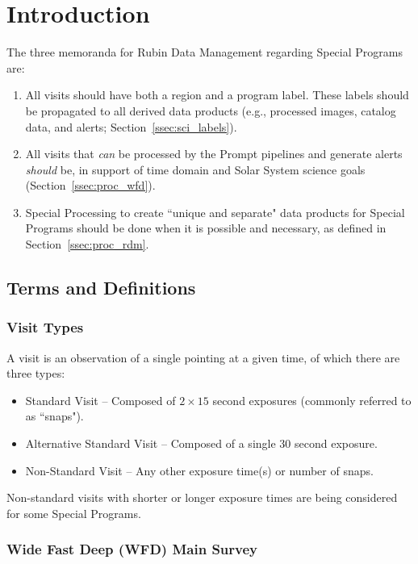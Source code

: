 \section{Introduction} \label{sec:intro}

The three memoranda for Rubin Data Management regarding Special Programs are:
\begin{enumerate}
\item All visits should have both a region and a program label.
These labels should be propagated to all derived data products
(e.g., processed images, catalog data, and alerts; Section~\ref{ssec:sci_labels}).
\item All visits that \emph{can} be processed by the Prompt pipelines and generate 
alerts \emph{should} be, in support of time domain and Solar System science goals (Section~\ref{ssec:proc_wfd}).
\item Special Processing to create ``unique and separate" data products for Special Programs
should be done when it is possible and necessary, as defined in Section~\ref{ssec:proc_rdm}. 
\end{enumerate}

\subsection{Terms and Definitions}\label{ssec:intro_terms}

\subsubsection{Visit Types}

A visit is an observation of a single pointing at a given time, of which 
there are three types:

\begin{itemize}
\item Standard Visit -- Composed of $2\times15$ second exposures (commonly referred to as ``snaps").
\item Alternative Standard Visit -- Composed of a single $30$ second exposure.
\item Non-Standard Visit -- Any other exposure time(s) or number of snaps.
\end{itemize}

Non-standard visits with shorter or longer exposure times are being 
considered for some Special Programs.

\subsubsection{Wide Fast Deep (WFD) Main Survey}

